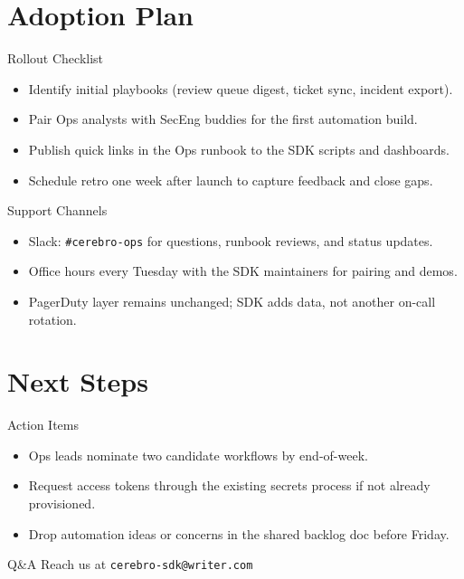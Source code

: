 \documentclass[aspectratio=169]{beamer}
\begin{document}
\section{Adoption Plan}

\begin{frame}{Rollout Checklist}
  \begin{itemize}
    \item Identify initial playbooks (review queue digest, ticket sync, incident export).
    \item Pair Ops analysts with SecEng buddies for the first automation build.
    \item Publish quick links in the Ops runbook to the SDK scripts and dashboards.
    \item Schedule retro one week after launch to capture feedback and close gaps.
  \end{itemize}
\end{frame}

\begin{frame}{Support Channels}
  \begin{itemize}
    \item Slack: \texttt{\#cerebro-ops} for questions, runbook reviews, and status updates.
    \item Office hours every Tuesday with the SDK maintainers for pairing and demos.
    \item PagerDuty layer remains unchanged; SDK adds data, not another on-call rotation.
  \end{itemize}
\end{frame}

\section{Next Steps}

\begin{frame}{Action Items}
  \begin{itemize}
    \item Ops leads nominate two candidate workflows by end-of-week.
    \item Request access tokens through the existing secrets process if not already provisioned.
    \item Drop automation ideas or concerns in the shared backlog doc before Friday.
  \end{itemize}
\end{frame}

\begin{frame}{Q\&A}
  \centering
  Reach us at \texttt{cerebro-sdk@writer.com}
\end{frame}
\end{document}
